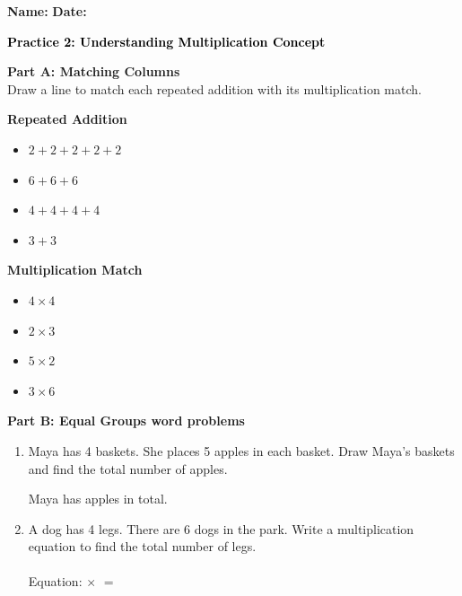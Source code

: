 \documentclass[12pt, letterpaper, fleqn]{article}
\newcommand{\blank}{\underline{\hspace{2.2cm}}}
\begin{document}
\textbf{Name:} \underline{\hspace{5cm}}
\hfill
\textbf{Date:} \underline{\hspace{3cm}}\\

\begin{tcolorbox}[colback=customteal!20]
    \large\textcolor{black}{\textbf{Practice 2: Understanding Multiplication Concept}}
\end{tcolorbox}

\vspace{5mm}
\noindent
\textbf{Part A: Matching Columns} \\
Draw a line to match each repeated addition with its multiplication match.

\vspace{5mm}
\begin{minipage}{0.45\textwidth}
\textbf{Repeated Addition}
\begin{itemize}[label=$\bullet$, itemsep=1.2cm]
    \item $2 + 2 + 2 + 2 + 2$
    \item $6 + 6 + 6$
    \item $4 + 4 + 4 + 4$
    \item $3 + 3$
\end{itemize}
\end{minipage}
\begin{minipage}{0.45\textwidth}
\textbf{Multiplication Match}
\begin{itemize}[label=$\bullet$, itemsep=1.2cm]
    \item $4 \times 4$
    \item $2 \times 3$
    \item $5 \times 2$
    \item $3 \times 6$
\end{itemize}
\end{minipage}

\newpage
\begin{tcolorbox}[colback=customteal!10]
\textbf{Part B: Equal Groups word problems}
\end{tcolorbox}

\vspace{5mm}
\begin{enumerate}[itemsep=2.5cm, leftmargin=0.6cm]
\item Maya has 4 baskets. She places 5 apples in each basket. Draw Maya's baskets and find the total number of apples.

\vspace{4cm}
Maya has \blank apples in total.

\item A dog has 4 legs. There are 6 dogs in the park. Write a multiplication equation to find the total number of legs.
\\ \\
Equation: \blank $\times$ \blank $=$ \blank
\end{enumerate}
\end{document}
